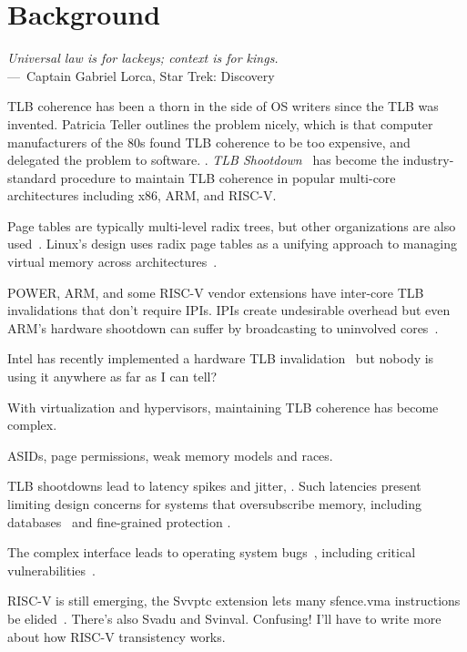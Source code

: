
\chapter{Background}
\label{ch:Background}

\begin{epigraph}
	\emph{Universal law is for lackeys; context is for kings.}\\
	---~Captain Gabriel Lorca, Star Trek: Discovery
\end{epigraph}

TLB coherence has been a thorn in the side of OS writers since the TLB was invented. Patricia Teller outlines the problem nicely, which is that computer manufacturers of the 80s found TLB coherence to be too expensive, and delegated the problem to software. \cite{teller_cost_1990}. \textit{TLB Shootdown}~\cite{black_translation_1989} has become the industry-standard procedure to maintain TLB coherence in popular multi-core architectures including x86, ARM, and RISC-V.

Page tables are typically multi-level radix trees, but other organizations are also used~\cite{jacob_look_1998}. Linux's design uses radix page tables as a unifying approach to managing virtual memory across architectures~\cite{torvalds_linux_1997}.

POWER, ARM, and some RISC-V vendor extensions have inter-core TLB invalidations that don't require IPIs. IPIs create undesirable overhead but even ARM's hardware shootdown can suffer by broadcasting to uninvolved cores~\cite{takao_indoh_patch_2019}.

Intel has recently implemented a hardware TLB invalidation~\cite{intel_corporation_remote_2021} but nobody is using it anywhere as far as I can tell?

With virtualization and hypervisors, maintaining TLB coherence has become complex.

ASIDs, page permissions, weak memory models and races.

TLB shootdowns lead to latency spikes and jitter, \cite{rigtorp_latency_2020, gallenmuller_ducked_2021, gallenmuller_how_2022}. Such latencies present limiting design concerns for systems that oversubscribe memory, including databases~\cite{crotty_are_2022} and fine-grained protection \cite{porter_decker_2023}.

The complex interface leads to operating system bugs~\cite{wong_tlb_2015}, including critical vulnerabilities~\cite{horn_project_2019}.

RISC-V is still emerging, the Svvptc extension lets many sfence.vma instructions be elided~\cite{ghiti_patch_2024}. There's also Svadu and Svinval. Confusing! I'll have to write more about how RISC-V transistency works.

\endinput